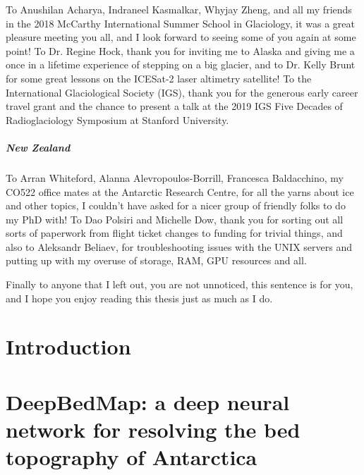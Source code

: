 \documentclass[12pt,twoside]{book}
\begin{document}
\begin{CJK*}{UTF8}{gbsn}
To Anushilan Acharya, Indraneel Kasmalkar, Whyjay Zheng, and all my friends in the 2018 McCarthy International Summer School in Glaciology, it was a great pleasure meeting you all, and I look forward to seeing some of you again at some point!
To Dr. Regine Hock, thank you for inviting me to Alaska and giving me a once in a lifetime experience of stepping on a big glacier, and to Dr. Kelly Brunt for some great lessons on the ICESat-2 laser altimetry satellite!
To the International Glaciological Society (IGS), thank you for the generous early career travel grant and the chance to present a talk at the 2019 IGS Five Decades of Radioglaciology Symposium at Stanford University.

\paragraph{New Zealand}

To Arran Whiteford, Alanna Alevropoulos-Borrill, Francesca Baldacchino, my CO522 office mates at the Antarctic Research Centre, for all the yarns about ice and other topics, I couldn't have asked for a nicer group of friendly folks to do my PhD with!
To Dao Polsiri and Michelle Dow, thank you for sorting out all sorts of paperwork from flight ticket changes to funding for trivial things, and also to Aleksandr Beliaev, for troubleshooting issues with the UNIX servers and putting up with my overuse of storage, RAM, GPU resources and all.

Finally to anyone that I left out, you are not unnoticed, this sentence is for you, and I hope you enjoy reading this thesis just as much as I do.

\end{CJK*}

\tableofcontents
\listoffigures
\listoftables

\printnoidxglossary[type=symbols,sort=use,style=long,title={List of Symbols}]
\printglossary[type=\acronymtype]

\chapter{Introduction}


\chapter{DeepBedMap: a deep neural network for resolving the bed topography of Antarctica}

\end{document}
